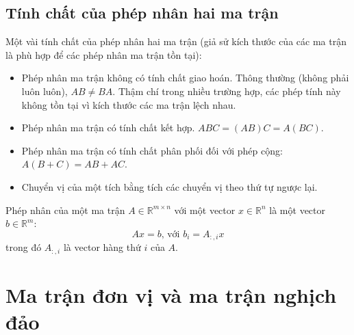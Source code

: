 \documentclass[12pt,a4paper]{report}
\begin{document}
	\subsection{Tính chất của phép nhân hai ma trận}
	Một vài tính chất của phép nhân hai ma trận (giả sử kích thước của các ma trận là phù hợp để các phép nhân ma trận tồn tại):
	\begin{itemize}
		\item Phép nhân ma trận không có tính chất giao hoán. Thông thường (không phải luôn luôn), $AB \neq BA$. Thậm chí trong nhiều trường hợp, các phép tính này không tồn tại vì kích thước các ma trận lệch nhau.
		\item Phép nhân ma trận có tính chất kết hợp. $ABC = (AB)C = A(BC)$.
		\item Phép nhân ma trận có tính chất phân phối đối với phép cộng: $A(B + C) = AB + AC$.
		\item Chuyển vị của một tích bằng tích các chuyển vị theo thứ tự ngược lại. 
	\end{itemize}
	\noindent
	Phép nhân của một ma trận $A \in \mathbb{R}^{m \times n}$ với một vector $x \in \mathbb{R}^{n}$ là một vector $b \in \mathbb{R}^m$:
	\begin{equation}
		Ax = b \text{, với } b_i = A_{:,i}x
	\end{equation} trong đó $A_{:,i}$  là vector hàng thứ $i$ của $A$.
	\section{Ma trận đơn vị và ma trận nghịch đảo}
\end{document}
